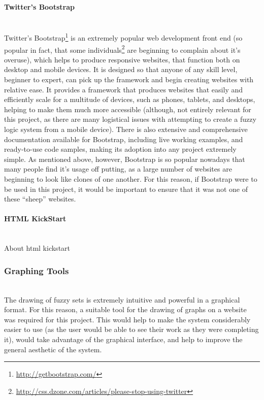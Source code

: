 \paragraph{Twitter's Bootstrap}\ \\
Twitter's Bootstrap\footnote{\url{http://getbootstrap.com/}} is an extremely popular web development front end (so popular in fact, that some individuals\footnote{\url{http://css.dzone.com/articles/please-stop-using-twitter}} are beginning to complain about it's overuse), which helps to produce responsive websites, that function both on  desktop and mobile devices. It is designed so that anyone of any skill level, beginner to expert, can pick up the framework and begin creating websites with relative ease. It provides a framework that produces websites that easily and efficiently scale for a multitude of devices, such as phones, tablets, and desktops, helping to make them much more accessible (although, not entirely relevant for this project, as there are many logistical issues with attempting to create a fuzzy logic system from a mobile device). There is also extensive and comprehensive documentation available for Bootstrap, including live working examples, and ready-to-use code samples, making its adoption into any project extremely simple. As mentioned above, however, Bootstrap is so popular nowadays that many people find it's usage off putting, as a large number of websites are beginning to look like clones of one another. For this reason, if Bootstrap were to be used in this project, it would be important to ensure that it was not one of these ``sheep'' websites.	

\paragraph{HTML KickStart}\ \\
{\color{red} About html kickstart }

\subsubsection{Graphing Tools}\ \\
The drawing of fuzzy sets is extremely intuitive and powerful in a graphical format. For this reason, a suitable tool for the drawing of graphs on a website was required for this project. This would help to make the system considerably easier to use (as the user would be able to see their work as they were completing it), would take advantage of the graphical interface, and help to improve the general aesthetic of the system. 
